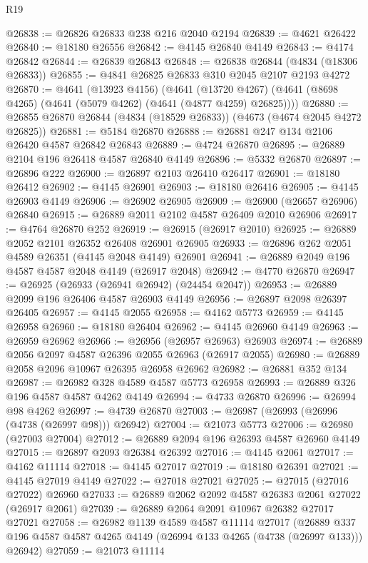 \begin{lexlean}{R19}
\begin{coremodule}
@26838 := @26826 @26833 @238 @216 @2040 @2194
@26839 := @4621 @26422
@26840 := @18180 @26556
@26842 := @4145 @26840 @4149
@26843 := @4174 @26842
@26844 := @26839 @26843
@26848 := @26838 @26844 (@4834 (@18306 @26833))
@26855 := @4841 @26825 @26833 @310 @2045 @2107 @2193 @4272
@26870 := @4641
    (@13923 @4156)
    (@4641 (@13720 @4267) (@4641 (@8698 @4265) (@4641 (@5079 @4262) (@4641 (@4877 @4259) @26825))))
@26880 := @26855 @26870 @26844 (@4834 (@18529 @26833)) (@4673 (@4674 @2045 @4272 @26825))
@26881 := @5184 @26870
@26888 := @26881 @247 @134 @2106 @26420 @4587 @26842 @26843
@26889 := @4724 @26870
@26895 := @26889 @2104 @196 @26418 @4587 @26840 @4149
@26896 := @5332 @26870
@26897 := @26896 @222
@26900 := @26897 @2103 @26410 @26417
@26901 := @18180 @26412
@26902 := @4145 @26901
@26903 := @18180 @26416
@26905 := @4145 @26903 @4149
@26906 := @26902 @26905
@26909 := @26900 (@26657 @26906) @26840
@26915 := @26889 @2011 @2102 @4587 @26409 @2010 @26906
@26917 := @4764 @26870 @252
@26919 := @26915 (@26917 @2010)
@26925 := @26889 @2052 @2101 @26352 @26408 @26901 @26905
@26933 := @26896 @262 @2051 @4589 @26351 (@4145 @2048 @4149) @26901
@26941 := @26889 @2049 @196 @4587 @4587 @2048 @4149 (@26917 @2048)
@26942 := @4770 @26870
@26947 := @26925 (@26933 (@26941 @26942) (@24454 @2047))
@26953 := @26889 @2099 @196 @26406 @4587 @26903 @4149
@26956 := @26897 @2098 @26397 @26405
@26957 := @4145 @2055
@26958 := @4162 @5773
@26959 := @4145 @26958
@26960 := @18180 @26404
@26962 := @4145 @26960 @4149
@26963 := @26959 @26962
@26966 := @26956 (@26957 @26963) @26903
@26974 := @26889 @2056 @2097 @4587 @26396 @2055 @26963 (@26917 @2055)
@26980 := @26889 @2058 @2096 @10967 @26395 @26958 @26962
@26982 := @26881 @352 @134
@26987 := @26982 @328 @4589 @4587 @5773 @26958
@26993 := @26889 @326 @196 @4587 @4587 @4262 @4149
@26994 := @4733 @26870
@26996 := @26994 @98 @4262
@26997 := @4739 @26870
@27003 := @26987 (@26993 (@26996 (@4738 (@26997 @98))) @26942)
@27004 := @21073 @5773
@27006 := @26980 (@27003 @27004)
@27012 := @26889 @2094 @196 @26393 @4587 @26960 @4149
@27015 := @26897 @2093 @26384 @26392
@27016 := @4145 @2061
@27017 := @4162 @11114
@27018 := @4145 @27017
@27019 := @18180 @26391
@27021 := @4145 @27019 @4149
@27022 := @27018 @27021
@27025 := @27015 (@27016 @27022) @26960
@27033 := @26889 @2062 @2092 @4587 @26383 @2061 @27022 (@26917 @2061)
@27039 := @26889 @2064 @2091 @10967 @26382 @27017 @27021
@27058 := @26982
    @1139
    @4589
    @4587
    @11114
    @27017
    (@26889 @337 @196 @4587 @4587 @4265 @4149 (@26994 @133 @4265 (@4738 (@26997 @133))) @26942)
@27059 := @21073 @11114

\end{coremodule}
\end{lexlean}
